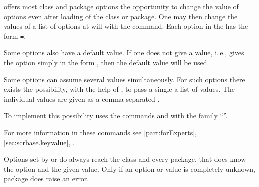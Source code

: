\begin{Declaration}
\end{Declaration}
\KOMAScript{} offers most class and package options the
opportunity to change the value of options even after loading of the
class or package. One may then change the values of a list of options
at will with the  command. Each option in the
 has the form
\texttt{=}.

Some options also have a default value. If one does not give a value,
i.\,e., gives the option simply in the form , then the
default value will be used.

Some options can assume several values simultaneously. For such options there
exists the possibility, with the help of , to pass a single
 a list of values. The individual values are given as a
comma-separated .

\begin{Explain}


  To implement this possibility {\KOMAScript} uses the commands
   and 
  with the family ``''.
\iffalse %
  More information on these commands %
  \IfThisCommonLabelBase{maincls}{for experts }{%
    \IfThisCommonLabelBase{scrlttr2}{for experts }{}}%
  is found in \autoref{sec:scrbase.keyvalue},
  \DescPageRef{scrbase.cmd.FamilyOptions}.
\else
  For more information in these commands see \autoref{part:forExperts},
  \autoref{sec:scrbase.keyvalue},
  .
\fi
\end{Explain}

Options set by  or  do always reach the
\KOMAScript{} class and every \KOMAScript{} package, that does know the option
and the given value. Only if an option or value is completely unknown, package
\hyperref[cha:scrbase]{} does raise an
error.%
\EndIndexGroup
%
\EndIndexGroup


